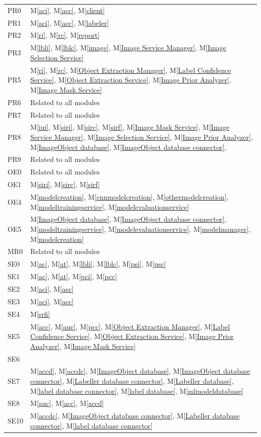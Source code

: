 \documentclass[12pt, titlepage]{article}
\newcommand{\mref}[1]{M\ref{#1}}
\begin{document}
\begin{longtable}{p{} p{}}
PR0 & \mref{aci}, \mref{acc}, \mref{client} \\
PR1 & \mref{aci}, \mref{acc}, \mref{labeler} \\
PR2 & \mref{ri}, \mref{rc}, \mref{report} \\
PR3 & \mref{lbli}, \mref{lblc}, \mref{image}, \mref{Image Service Manager}, \mref{Image Selection Service} \\
PR5 &  \mref{ri}, \mref{rc}, \mref{Object Extraction Manager}, \mref{Label Confidence Service}, \mref{Object Extraction Service}, \mref{Image Prior Analyzer}, \mref{Image Mask Service}\\
PR6 & Related to all modules \\
PR7 & Related to all modules \\
PR8 & \mref{iui}, \mref{siri}, \mref{sirc}, \mref{sirf}, \mref{Image Mask Service}, \mref{Image Service Manager}, \mref{Image Selection Service}, \mref{Image Prior Analyzer}, \mref{ImageObject database}, \mref{ImageObject database connector}, \\
PR9 & Related to all modules \\
OE0 & Related to all modules \\
OE1 & \mref{siri}, \mref{sirc}, \mref{sirf} \\
OE4 &  \mref{modelcreation}, \mref{cnnmodelcreation}, \mref{othermodelcreation}, \mref{modeltrainingservice}, \mref{modelevaluationservice} \\
OE5 &  \mref{ImageObject database}, \mref{ImageObject database connector}, \mref{modeltrainingservice}, \mref{modelevaluationservice}, \mref{modelmanager}, \mref{modelcreation}\\
MR0 & Related to all modules \\
SE0 & \mref{ac}, \mref{at}, \mref{lbli}, \mref{lblc}, \mref{psi}, \mref{psc} \\
SE1 & \mref{ac}, \mref{at}, \mref{pci}, \mref{pcc} \\
SE2 & \mref{aci}, \mref{acc} \\
SE3 & \mref{aci}, \mref{acc} \\
SE4 & \mref{srfi} \\
SE5 & \mref{acc}, \mref{auc}, \mref{pcc}, \mref{Object Extraction Manager}, \mref{Label Confidence Service}, \mref{Object Extraction Service}, \mref{Image Prior Analyzer}, \mref{Image Mask Service}\\
SE6 &  \\
SE7 & \mref{accd}, \mref{accdc}, \mref{ImageObject database}, \mref{ImageObject database connector}, \mref{Labeller database connector}, \mref{Labeller database}, \mref{label database connector}, \mref{label database}, \mref{mlmodeldatabase} \\
SE8 & \mref{auc}, \mref{acc}, \mref{accd} \\
SE10 & \mref{accdc}, \mref{ImageObject database connector}, \mref{Labeller database connector}, \mref{label database connector} \\

\end{longtable}
\end{document}
